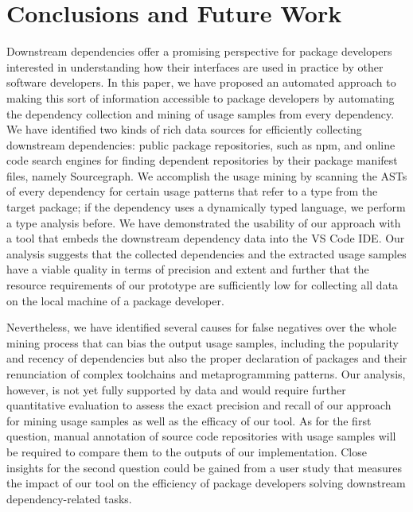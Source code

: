 \documentclass[a4paper,twoside]{article}
\begin{document}
\section{Conclusions and Future Work}
\label{sec:conclusion}

Downstream dependencies offer a promising perspective for package developers interested in understanding how their interfaces are used in practice by other software developers.
In this paper, we have proposed an automated approach to making this sort of information accessible to package developers by automating the dependency collection and mining of usage samples from every dependency.
We have identified two kinds of rich data sources for efficiently collecting downstream dependencies: public package repositories, such as npm, and online code search engines for finding dependent repositories by their package manifest files, namely Sourcegraph.
We accomplish the usage mining by scanning the ASTs of every dependency for certain usage patterns that refer to a type from the target package; if the dependency uses a dynamically typed language, we perform a type analysis before.
We have demonstrated the usability of our approach with a tool that embeds the downstream dependency data into the VS Code IDE.
Our analysis suggests that the collected dependencies and the extracted usage samples have a viable quality in terms of precision and extent and further that the resource requirements of our prototype are sufficiently low for collecting all data on the local machine of a package developer.

Nevertheless, we have identified several causes for false negatives over the whole mining process that can bias the output usage samples, including the popularity and recency of dependencies but also the proper declaration of packages and their renunciation of complex toolchains and metaprogramming patterns.
Our analysis, however, is not yet fully supported by data and would require further quantitative evaluation to assess the exact precision and recall of our approach for mining usage samples as well as the efficacy of our tool.
As for the first question, manual annotation of source code repositories with usage samples will be required to compare them to the outputs of our implementation.
Close insights for the second question could be gained from a user study that measures the impact of our tool on the efficiency of package developers solving downstream dependency-related tasks.
\end{document}
